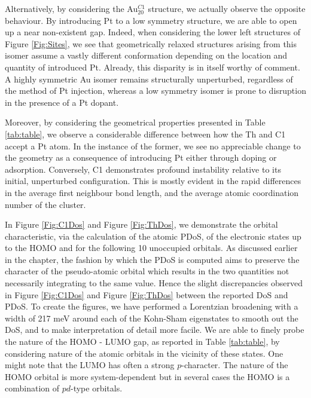 Alternatively, by considering the Au$^{C1}_{20}$ structure, we actually observe the opposite behaviour. By introducing Pt to a low symmetry structure, we are able to open up a near non-existent gap. Indeed, when considering the lower left structures of Figure \ref{Fig:Sites}, we see that geometrically relaxed structures arising from this isomer assume a vastly different conformation depending on the location and quantity of introduced Pt. Already, this disparity is in itself worthy of comment. A highly symmetric Au isomer remains structurally unperturbed, regardless of the method of Pt injection, whereas a low symmetry isomer is  prone to disruption in the presence of a Pt dopant.

Moreover, by considering the geometrical properties presented in Table \ref{tab:table}, we observe a considerable difference between how the Th and C1 accept a Pt atom. In the instance of the former, we see no appreciable change to the geometry as a consequence of introducing Pt either through doping or adsorption. Conversely, C1 demonstrates profound instability relative to its initial, unperturbed configuration. This is mostly evident in the rapid differences in the average first neighbour bond length, and the average atomic coordination number of the cluster.

In Figure \ref{Fig:C1Dos} and Figure \ref{Fig:ThDos}, we demonstrate the orbital characteristic, via the calculation of the atomic PDoS, of the electronic states up to the HOMO and for the following 10 unoccupied orbitals. As discussed earlier in the chapter, the fashion by which the PDoS is computed aims to preserve the character of the pseudo-atomic orbital which results in the two quantities not necessarily integrating to the same value. Hence the slight discrepancies observed in Figure \ref{Fig:C1Dos} and Figure \ref{Fig:ThDos} between the reported DoS and PDoS. To create the figures, we have performed a Lorentzian broadening with a width of 217 meV around each of the Kohn-Sham eigenstates to smooth out the DoS, and to make interpretation of detail more facile. We are able to finely probe the nature of the HOMO - LUMO gap, as reported in Table \ref{tab:table}, by considering nature of the atomic orbitals in the vicinity of these states. One might note that the LUMO has often a strong $p$-character. The nature of the HOMO orbital is more system-dependent but in several cases the HOMO is a combination of $pd$-type orbitals. 


